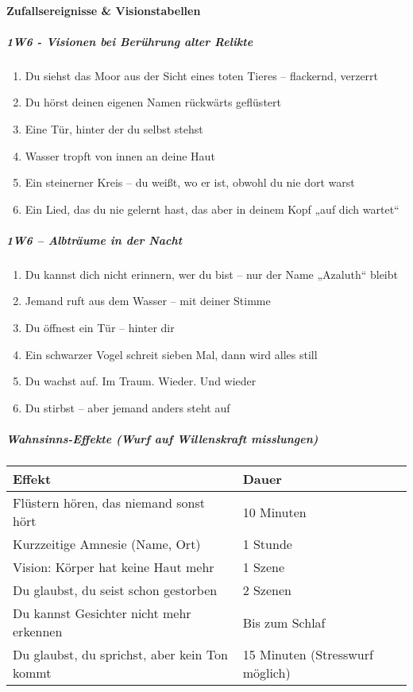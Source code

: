 \paragraph{Zufallsereignisse \& Visionstabellen}
\subparagraph{1W6 - Visionen bei Berührung alter Relikte}
\begin{enumerate}
\item Du siehst das Moor aus der Sicht eines toten Tieres – flackernd, verzerrt
\item Du hörst deinen eigenen Namen rückwärts geflüstert
\item Eine Tür, hinter der du selbst stehst
\item Wasser tropft von innen an deine Haut
\item Ein steinerner Kreis – du weißt, wo er ist, obwohl du nie dort warst
\item Ein Lied, das du nie gelernt hast, das aber in deinem Kopf „auf dich wartet“
\end{enumerate}
\subparagraph{1W6 – Albträume in der Nacht}
\begin{enumerate}
\item Du kannst dich nicht erinnern, wer du bist – nur der Name „Azaluth“ bleibt
\item Jemand ruft aus dem Wasser – mit deiner Stimme
\item Du öffnest ein Tür – hinter dir
\item Ein schwarzer Vogel schreit sieben Mal, dann wird alles still
\item Du wachst auf. Im Traum. Wieder. Und wieder
\item Du stirbst – aber jemand anders steht auf
\end{enumerate}

\subparagraph{Wahnsinns-Effekte (Wurf auf Willenskraft misslungen)}
\begin{center}
\begin{tabular}{ll}
\toprule
Effekt & Dauer\\
\midrule
Flüstern hören, das niemand sonst hört & 10 Minuten\\
\midrule
Kurzzeitige Amnesie (Name, Ort) & 1 Stunde\\
\midrule
Vision: Körper hat keine Haut mehr & 1 Szene\\
\midrule
Du glaubst, du seist schon gestorben & 2 Szenen\\
\midrule
Du kannst Gesichter nicht mehr erkennen & Bis zum Schlaf\\
\midrule
Du glaubst, du sprichst, aber kein Ton kommt & 15 Minuten (Stresswurf möglich)\\
\bottomrule
\end{tabular}
\end{center}
\newpage
